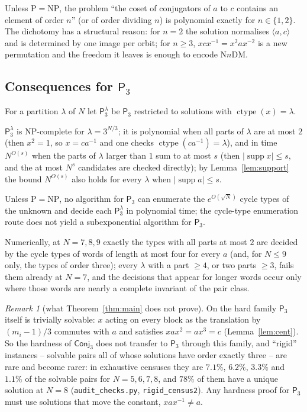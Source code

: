 \documentclass[preprint,12pt]{elsarticle}
\theoremstyle{definition}\newtheorem{defi}[thm]{Definition}\newtheorem{prob}[thm]{Problem}\newtheorem{obs}[thm]{Observation}
\theoremstyle{remark}\newtheorem{rem}[thm]{Remark}
\newcommand{\ctype}{\operatorname{ctype}}\DeclareMathOperator{\Cent}{C}\DeclareMathOperator{\supp}{supp}
\newcommand{\Pthree}{\mathsf{P}_3}\newcommand{\Conj}[1]{\mathsf{Conj}_{#1}}\newcommand{\Dzero}{\Conj{3}}\newcommand{\TR}{T_{\mathcal R}}
\begin{document}
\begin{cor}\label{cor:classification}
Unless $\mathrm P=\mathrm{NP}$, the problem ``the coset of conjugators of $a$ to $c$ contains an element of order $n$'' (or of order dividing $n$)
is polynomial exactly for $n\in\{1,2\}$. The dichotomy has a structural reason: for $n=2$ the solution normalises $\langle a,c\rangle$ and is
determined by one image per orbit; for $n\ge3$, $xcx^{-1}=x^{2}ax^{-2}$ is a new permutation and the freedom it leaves is enough to encode
$\mathrm{N}n\mathrm{DM}$.
\end{cor}

\subsection{Consequences for \texorpdfstring{$\Pthree$}{P3}}

For a partition $\lambda$ of $N$ let $\Pthree^{\lambda}$ be $\Pthree$ restricted to solutions with $\ctype(x)=\lambda$.
\begin{cor}\label{cor:lambda}
$\Pthree^{\lambda}$ is NP-complete for $\lambda=3^{N/3}$; it is polynomial when all parts of $\lambda$ are at most $2$ (then $x^{2}=1$, so $x=ca^{-1}$ and one checks $\ctype(ca^{-1})=\lambda$), and in time $N^{O(s)}$ when the parts of $\lambda$ larger than $1$ sum to at most $s$ (then $|\supp x|\le s$, and the at most $N^{s}$ candidates are checked directly); by Lemma~\ref{lem:support} the bound $N^{O(s)}$ also holds for every $\lambda$ when $|\supp a|\le s$.
\end{cor}
\begin{cor}\label{cor:noenum}
Unless $\mathrm P=\mathrm{NP}$, no algorithm for $\Pthree$ can enumerate the $e^{O(\sqrt N)}$ cycle types of the unknown and decide each $\Pthree^{\lambda}$ in polynomial time; the cycle-type enumeration route does not yield a subexponential algorithm for $\Pthree$.
\end{cor}
Numerically, at $N=7,8,9$ exactly the types with all parts at most $2$ are decided by the cycle types of words of length at most four for every $a$ (and, for $N\le9$ only, the types of order three); every $\lambda$ with a part $\ge4$, or two parts $\ge3$, fails them already at $N=7$, and the decisions that appear for longer words occur only where those words are nearly a complete invariant of the pair class.

\begin{rem}[what Theorem~\ref{thm:main} does not prove]\label{rem:notproved}
On the hard family $\Pthree$ itself is trivially solvable: $x$ acting on every block as the translation by $(m_i-1)/3$ commutes with $a$ and satisfies $xax^{2}=ax^{3}=c$ (Lemma~\ref{lem:cent}). So the hardness of $\Dzero$ does not transfer to $\Pthree$ through this family, and ``rigid'' instances -- solvable pairs all of whose solutions have order exactly three -- are rare and become rarer: in exhaustive
censuses they are $7.1\%$, $6.2\%$, $3.3\%$ and $1.1\%$ of the solvable pairs for $N=5,6,7,8$, and $78\%$ of them have a unique solution at
$N=8$ (\texttt{audit\_checks.py}, \texttt{rigid\_census2}). Any hardness proof for $\Pthree$ must use solutions that move the constant, $xax^{-1}\neq a$.
\end{rem}
\end{document}
